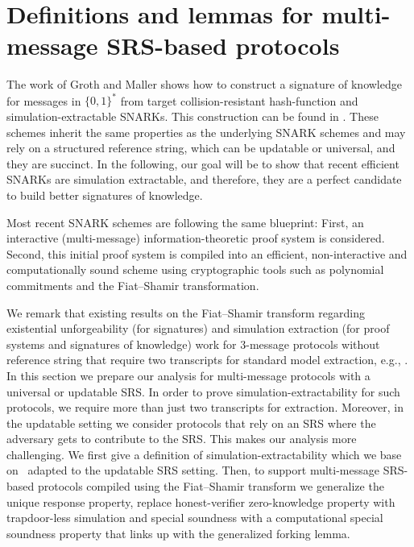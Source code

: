 \section{Definitions and lemmas for multi-message SRS-based protocols}
\label{sec:se_definitions}


  The work of Groth and Maller
\cite{C:GroMal17} shows how to construct a signature of knowledge for messages in
$\{0, 1\}^*$ from target collision-resistant hash-function and simulation-extractable
SNARKs. This construction can be found in .
These schemes inherit the same properties as the underlying SNARK schemes and
may rely on a structured reference string, which can be updatable or universal, and they are
succinct.  In the following, our goal will be to show that recent efficient SNARKs are
simulation extractable, and therefore, they are a perfect candidate to build better
signatures of knowledge.

  Most recent SNARK schemes
are following the same blueprint: First, an interactive (multi-message)
information-theoretic proof system is considered.
Second, this initial proof system is compiled into an efficient, non-interactive and
computationally sound scheme using cryptographic tools such as polynomial commitments
and the Fiat--Shamir transformation.

We remark that existing results on the Fiat--Shamir transform regarding existential
unforgeability (for signatures) and simulation extraction (for proof systems and
signatures of knowledge) work for $3$-message protocols without reference string that
require two transcripts for standard model extraction, e.g.,
\cite{JC:PoiSte00,INDOCRYPT:FKMV12,C:RotSeg21}.  In this section we prepare our
analysis for multi-message protocols with a universal or updatable SRS.  In order to
prove simulation-extractability for such protocols, we require more than just two
transcripts for extraction.  Moreover, in the updatable setting we consider protocols
that rely on an SRS where the adversary gets to contribute to the SRS. This makes our
analysis more challenging.  We first give a definition of simulation-extractability
which we base on~\cite{INDOCRYPT:FKMV12} adapted to the updatable SRS setting. Then,
to support multi-message SRS-based protocols compiled using the Fiat--Shamir transform
we generalize the unique response property, replace honest-verifier zero-knowledge
property with trapdoor-less simulation and special soundness with a computational special
soundness property that links up with the generalized forking lemma.

